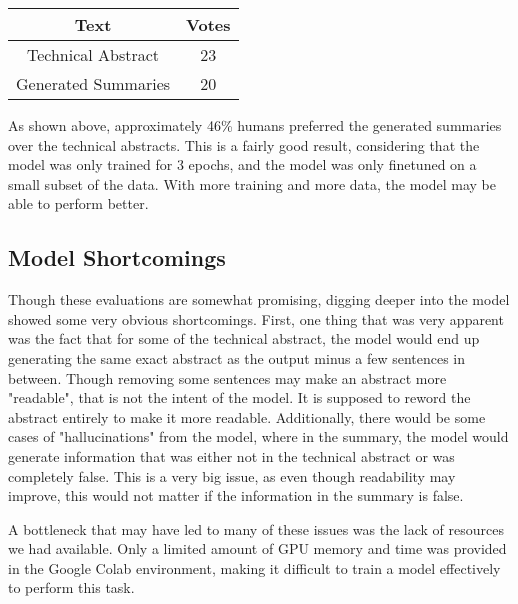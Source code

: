 \documentclass[11pt,a4paper]{article}
\begin{document}

\begin{table}[!htbp]
  \begin{tabular}{|c | c|} 
   \hline
   Text & Votes \\ [1ex] 
   \hline\hline
   Technical Abstract & 23 \\ [1ex]
   \hline
   Generated Summaries & 20 \\ [1ex]
   \hline
  \end{tabular}
\end{table}


\indent \indent As shown above, approximately 46\% humans preferred the generated summaries over the technical abstracts. This is a fairly good result, considering that the model was only trained for 3 epochs, and the model was only finetuned on a small subset of the data. With more training and more data, the model may be able to perform better.

\subsection{Model Shortcomings}
\indent \indent Though these evaluations are somewhat promising, digging deeper into the model showed some very obvious shortcomings. First, one thing that was very apparent was the fact that for some of the technical abstract, the model would end up generating the same exact abstract as the output minus a few sentences in between. Though removing some sentences may make an abstract more "readable", that is not the intent of the model. It is supposed to reword the abstract entirely to make it more readable. Additionally, there would be some cases of "hallucinations" from the model, where in the summary, the model would generate information that was either not in the technical abstract or was completely false. This is a very big issue, as even though readability may improve, this would not matter if the information in the summary is false.

A bottleneck that may have led to many of these issues was the lack of resources we had available. Only a limited amount of GPU memory and time was provided in the Google Colab environment, making it difficult to train a model effectively to perform this task.
\end{document}
